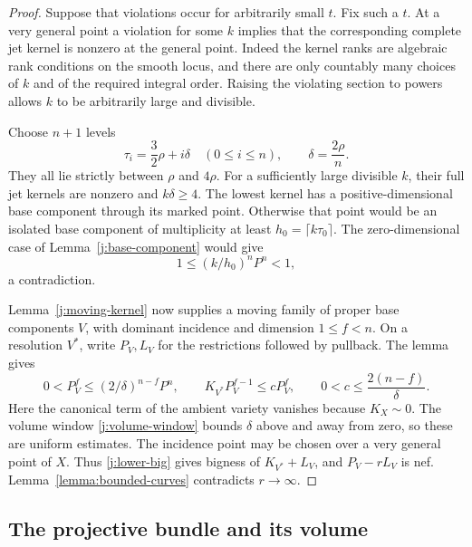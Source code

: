 \begin{proof}
Suppose that violations occur for arbitrarily small $t$. Fix such a
$t$. At a very general point a violation for some $k$ implies that
the corresponding complete jet kernel is nonzero at the general
point. Indeed the kernel ranks are algebraic rank conditions on the
smooth locus, and there are only countably many choices of $k$ and
of the required integral order. Raising the violating section to
powers allows $k$ to be arbitrarily large and divisible.

Choose $n+1$ levels
\[
 \tau_i=\frac32\rho+i\delta\quad(0\le i\le n),
 \qquad \delta=\frac{2\rho}{n}.
\]
They all lie strictly between $\rho$ and $4\rho$. For a sufficiently
large divisible $k$, their full jet kernels are nonzero and
$k\delta\ge4$. The lowest kernel has a positive-dimensional base
component through its marked point. Otherwise that point would be
an isolated base component of multiplicity at least
$h_0=\lceil k\tau_0\rceil$. The zero-dimensional case of
Lemma~\ref{j:base-component} would give
\[
                1\le (k/h_0)^nP^n<1,
\]
a contradiction.

Lemma~\ref{j:moving-kernel} now supplies a moving family of proper
base components $V$, with dominant incidence and dimension
$1\le f<n$. On a resolution $V^*$, write $P_V,L_V$ for the
restrictions followed by pullback. The lemma gives
\[
 0<P_V^f\le(2/\delta)^{n-f}P^n,
 \qquad K_{V^*}P_V^{f-1}\le cP_V^f,
 \qquad 0<c\le\frac{2(n-f)}{\delta}.
\]
Here the canonical term of the ambient variety vanishes because
$K_X\sim0$. The volume window \eqref{j:volume-window} bounds
$\delta$ above and away from zero, so these are uniform estimates.
The incidence point may be chosen over a very general point of $X$.
Thus \eqref{j:lower-big} gives bigness of $K_{V^*}+L_V$, and
$P_V-rL_V$ is nef. Lemma~\ref{lemma:bounded-curves} contradicts
$r\to\infty$.
\end{proof}

\subsection{The projective bundle and its volume}

